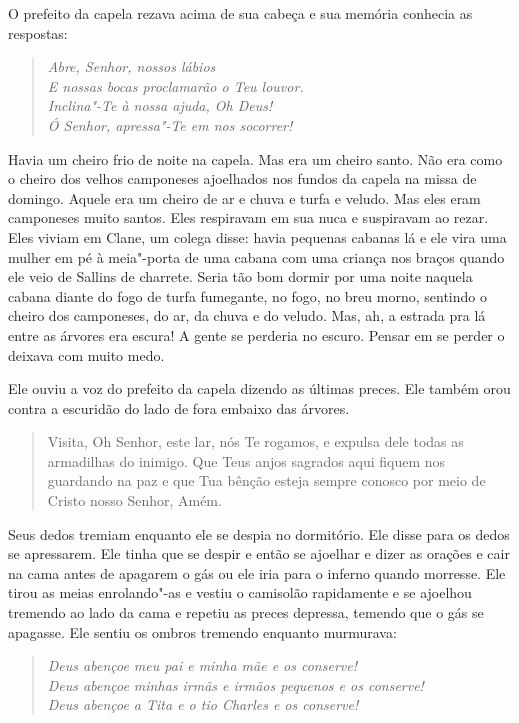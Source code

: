 O prefeito da capela rezava acima de sua cabeça e sua memória conhecia
as respostas:

\begin{verse}\itshape
Abre, Senhor, nossos lábios\\
E nossas bocas proclamarão o Teu louvor.\\
Inclina"-Te à nossa ajuda, Oh Deus!\\
Ó Senhor, apressa"-Te em nos socorrer!
\end{verse}

Havia um cheiro frio de noite na capela. Mas era um cheiro santo. Não
era como o cheiro dos velhos camponeses ajoelhados nos fundos da capela
na missa de domingo. Aquele era um cheiro de ar e chuva e turfa e
veludo. Mas eles eram camponeses muito santos. Eles respiravam em sua
nuca e suspiravam ao rezar. Eles viviam em Clane, um colega disse:
havia pequenas cabanas lá e ele vira uma mulher em pé à meia"-porta de
uma cabana com uma criança nos braços quando ele veio de Sallins de
charrete. Seria tão bom dormir por uma noite naquela cabana diante do
fogo de turfa fumegante, no fogo, no breu morno, sentindo o cheiro dos
camponeses, do ar, da chuva e do veludo. Mas, ah, a estrada pra lá
entre as árvores era escura! A gente se perderia no escuro. Pensar em
se perder o deixava com muito medo.

Ele ouviu a voz do prefeito da capela dizendo as últimas preces. Ele
também orou contra a escuridão do lado de fora embaixo das árvores.

\begin{quote}
Visita, Oh Senhor, este lar, nós Te rogamos, e expulsa dele todas as
armadilhas do inimigo. Que Teus anjos sagrados aqui fiquem nos
guardando na paz e que Tua bênção esteja sempre conosco por meio de
Cristo nosso Senhor, Amém.

\end{quote}
Seus dedos tremiam enquanto ele se despia no dormitório. Ele disse para os
dedos se apressarem. Ele tinha que se despir e então se ajoelhar e
dizer as orações e cair na cama antes de apagarem o gás ou ele iria
para o inferno quando morresse. Ele tirou as meias enrolando"-as e
vestiu o camisolão rapidamente e se ajoelhou tremendo ao lado da cama e
repetiu as preces depressa, temendo que o gás se apagasse. Ele sentiu os
ombros tremendo enquanto murmurava:

\begin{verse}\itshape
Deus abençoe meu pai e minha mãe e os conserve!\\
Deus abençoe minhas irmãs e irmãos pequenos e os conserve!\\
Deus abençoe a Tita e o tio Charles e os conserve!
\end{verse}

